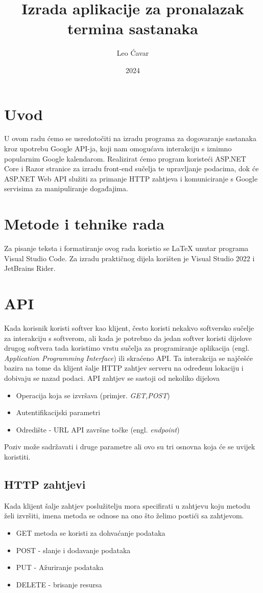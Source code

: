 \documentclass{foi}
\title{Izrada aplikacije za pronalazak termina sastanaka}
\author{Leo Ćavar}
\date{2024}
\begin{document}
\maketitle

\tableofcontents

\pagestyle{plain}
\chapter{Uvod}
U ovom radu ćemo se usredotočiti na izradu programa za dogovaranje sastanaka kroz upotrebu Google API-ja, koji nam omogućava interakciju s iznimno popularnim Google kalendarom. Realizirat ćemo program koristeći ASP.NET Core i Razor stranice za izradu front-end sučelja te upravljanje podacima, dok će ASP.NET Web API služiti za primanje HTTP zahtjeva i komuniciranje s Google servisima za manipuliranje događajima.

\chapter{Metode i tehnike rada}
Za pisanje teksta i formatiranje ovog rada koristio se LaTeX unutar programa Visual Studio Code. Za izradu praktičnog dijela korišten je Visual Studio 2022 i JetBrains Rider.

\chapter{API}
Kada korisnik koristi softver kao klijent, često koristi nekakvo softversko sučelje za interakciju s softverom, ali kada je potrebno da jedan softver koristi dijelove drugog softvera tada koristimo vrstu sučelja za programiranje aplikacija (engl. \textit{Application Programming Interface}) ili skraćeno API.\cite{biehl2015api}
Ta interakcija se najčešće bazira na tome da klijent šalje HTTP zahtjev serveru na određenu lokaciju i dobivaju se nazad podaci.
API zahtjev se sastoji od nekoliko dijelova \cite{altexsoft}
\begin{itemize}
    \item Operacija koja se izvršava (primjer. \textit{GET,POST})
    \item Autentifikacijski parametri
    \item Odredište - URL API završne točke (engl. \textit{endpoint})
\end{itemize}
Poziv može sadržavati i druge parametre ali ovo su tri osnovna koja će se uvijek koristiti.
\section{HTTP zahtjevi}
Kada klijent šalje zahtjev poslužitelju mora specifirati u zahtjevu koju metodu želi izvršiti, imena metoda se odnose na ono što želimo postići sa zahtjevom. \cite{Maurya2021} 
\begin{itemize}
    \item GET metoda se koristi za dohvaćanje podataka
    \item POST - slanje i dodavanje podataka
    \item PUT - Ažuriranje podataka
    \item DELETE - brisanje resursa 
\end{itemize}
\end{document}
